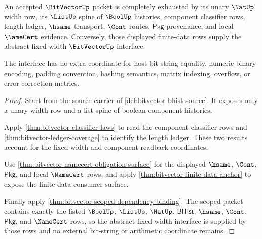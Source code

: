 \begin{theorem}
\label{thm:bitvector-boolean-list-width-exhaustion}
An accepted $\BitVectorUp$ packet is completely exhausted by its unary
$\NatUp$ width row, its $\ListUp$ spine of $\BoolUp$ histories, component
classifier rows, length ledger, $\hsame$ transport, $\Cont$ routes,
$\mathsf{Pkg}$ provenance, and local $\NameCert$ evidence. Conversely, those
displayed finite-data rows supply the abstract fixed-width $\BitVectorUp$
interface.

The interface has no extra coordinate for host bit-string equality, numeric
binary encoding, padding convention, hashing semantics, matrix indexing,
overflow, or error-correction metrics.
\end{theorem}
\begin{proof}
Start from the source carrier of \autoref{def:bitvector-bhist-source}. It
exposes only a unary width row and a list spine of boolean component histories.

Apply \autoref{thm:bitvector-classifier-laws} to read the component
classifier rows and \autoref{thm:bitvector-ledger-coverage} to identify the
length ledger. These two results account for the fixed-width and component
readback coordinates.

Use \autoref{thm:bitvector-namecert-obligation-surface} for the displayed
$\hsame$, $\Cont$, $\mathsf{Pkg}$, and local $\NameCert$ rows, and apply
\autoref{thm:bitvector-finite-data-anchor} to expose the finite-data consumer
surface.

Finally apply \autoref{thm:bitvector-scoped-dependency-binding}. The scoped
packet contains exactly the listed $\BoolUp$, $\ListUp$, $\NatUp$,
$\mathsf{BHist}$, $\hsame$, $\Cont$, $\mathsf{Pkg}$, and $\NameCert$ rows, so
the abstract fixed-width interface is supplied by those rows and no external
bit-string or arithmetic coordinate remains.
\end{proof}

